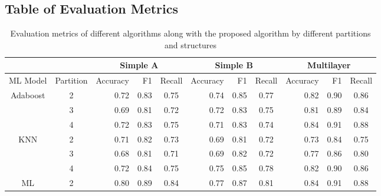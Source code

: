 \documentclass[12pt]{article}
\begin{document}
    \subsection*{Table of Evaluation Metrics}
    \begin{table}[H]
        \centering
        \label{table2}
        \caption{Evaluation metrics of different algorithms along with the proposed algorithm by different partitions and structures}
        \scriptsize
        \begin{tabular}{lrrrrrrrrrr}
            \hline
            &  & \multicolumn{3}{c}{Simple A} & \multicolumn{3}{c}{Simple B} & \multicolumn{3}{c}{Multilayer} \\
            \hline
            \multicolumn{1}{c}{ML Model} & \multicolumn{1}{c}{Partition} & Accuracy & F1 & \multicolumn{1}{c}{Recall}  & Accuracy & F1 & \multicolumn{1}{c}{Recall} & Accuracy & F1 & \multicolumn{1}{c}{Recall} \\
            \hline
            \multicolumn{1}{c}{\multirow{3}{*}{Adaboost}} & \multicolumn{1}{c}{2} & 0.72 & 0.83 & \multicolumn{1}{c}{0.75}  & 0.74 & 0.85 & \multicolumn{1}{c}{0.77} & 0.82 & 0.90 & \multicolumn{1}{c}{0.86} \\
            \multicolumn{1}{c}{} & \multicolumn{1}{c}{3} & 0.69 & 0.81 & \multicolumn{1}{c}{0.72} & 0.72 & 0.83 & \multicolumn{1}{c}{0.75} & 0.81 & 0.89 & \multicolumn{1}{c}{0.84} \\
            \multicolumn{1}{c}{} & \multicolumn{1}{c}{4} & 0.72 & 0.83 & \multicolumn{1}{c}{0.75}  & 0.71 & 0.83 & \multicolumn{1}{c}{0.74}  & 0.84 & 0.91 & \multicolumn{1}{c}{0.88}  \\
            \hline
            \multicolumn{1}{c}{\multirow{3}{*}{KNN}} & \multicolumn{1}{c}{2} & 0.71 & 0.82 & \multicolumn{1}{c}{0.73}  & 0.69 & 0.81 & \multicolumn{1}{c}{0.72}  & 0.73 & 0.84 & \multicolumn{1}{c}{0.75}  \\
            \multicolumn{1}{c}{} & \multicolumn{1}{c}{3} & 0.68 & 0.81 & \multicolumn{1}{c}{0.71} & 0.69 & 0.82 & \multicolumn{1}{c}{0.72}  & 0.77 & 0.86 & \multicolumn{1}{c}{0.80} \\
            \multicolumn{1}{c}{} & \multicolumn{1}{c}{4} & 0.72 & 0.84 & \multicolumn{1}{c}{0.75}  & 0.75 & 0.85 & \multicolumn{1}{c}{0.78} & 0.82 & 0.90 & \multicolumn{1}{c}{0.86} \\
            \hline
            \multicolumn{1}{c}{\multirow{3}{*}{ML}} & \multicolumn{1}{c}{2} & 0.80 & 0.89 & \multicolumn{1}{c}{0.84} & 0.77 & 0.87 & \multicolumn{1}{c}{0.81} & 0.84 & 0.91 & \multicolumn{1}{c}{0.88} \\

\end{tabular}
\end{table}
\end{document}

